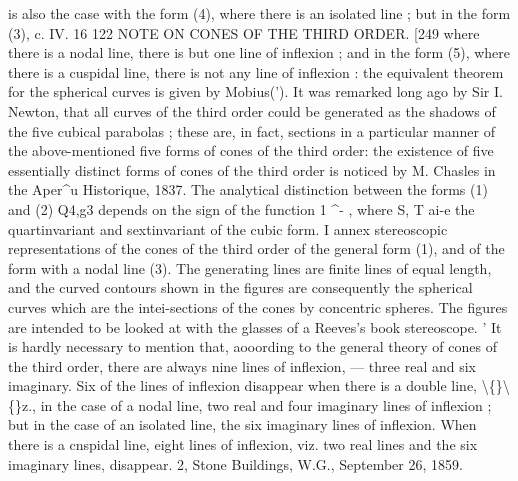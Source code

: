 \documentclass[11pt,a4paper]{book}
\begin{document}
is  also  the  case  with  the  form  (4),  where  there  is  an  isolated  line ;  but  in  the  form  (3),
c.  IV.  16
122  NOTE  ON   CONES   OF   THE   THIRD   ORDER.  [249
where  there  is  a  nodal  line,  there  is  but  one  line  of  inflexion ;  and  in  the  form  (5),
where  there  is  a  cuspidal  line,  there  is  not  any  line  of  inflexion :  the  equivalent
theorem  for  the  spherical  curves  is  given  by  Mobius(').  It  was  remarked  long  ago  by
Sir  I.  Newton,  that  all  curves  of  the  third  order  could  be  generated  as  the  shadows
of  the  five  cubical  parabolas ;  these  are,  in  fact,  sections  in  a  particular  manner  of
the  above-mentioned  five  forms  of  cones  of  the  third  order:  the  existence  of  five
essentially  distinct  forms  of  cones  of  the  third  order  is  noticed  by  M.  Chasles  in  the
Aper^u   Historique,   1837.      The    analytical    distinction    between    the    forms    (1)    and   (2)
Q4,g3
depends  on   the   sign   of  the   function    1   ^- ,  where  S,  T  ai-e   the  quartinvariant  and
sextinvariant  of  the  cubic  form.  I  annex  stereoscopic  representations  of  the  cones  of
the  third  order  of  the  general  form  (1),  and  of  the  form  with  a  nodal  line  (3).  The
generating  lines  are  finite  lines  of  equal  length,  and  the  curved  contours  shown  in  the
figures  are  consequently  the  spherical  curves  which  are  the  intei-sections  of  the  cones
by  concentric  spheres.  The  figures  are  intended  to  be  looked  at  with  the  glasses  of
a  Reeves's  book  stereoscope.
'  It  is  hardly  necessary  to  mention  that,  aooording  to  the  general  theory  of  cones  of  the  third  order,
there  are  always  nine  lines  of  inflexion, — three  real  and  six  imaginary.  Six  of  the  lines  of  inflexion  disappear
when  there  is  a  double  line,  \textbackslash\{\}\textbackslash\{\}z.,  in  the  case  of  a  nodal  line,  two  real  and  four  imaginary  lines  of  inflexion ;
but  in  the  case  of  an  isolated  line,  the  six  imaginary  lines  of  inflexion.  When  there  is  a  cnspidal  line,
eight  lines  of  inflexion,  viz.  two  real  lines  and  the  six  imaginary  lines,  disappear.
2,  Stone  Buildings,  W.G.,  September  26,  1859.


\newpage
\end{document}

